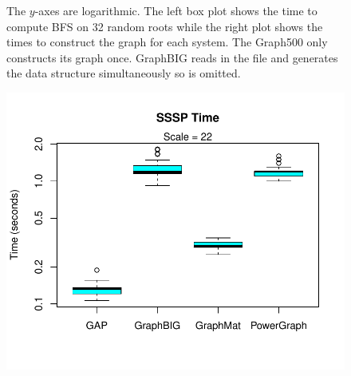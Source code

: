 \documentclass[conference]{IEEEtran}
\begin{document}
\begin{figure}
\begin{minipage}{0.48\linewidth}
	\end{minipage}
	\caption{The $y$-axes are logarithmic. The left box plot shows the time to compute BFS on 32 random roots while the right plot shows the times to construct the graph for each system. The Graph500 only constructs its graph once. GraphBIG reads in the file and generates the data structure simultaneously so is omitted.}
	\label{fig:bfs-time}
\end{figure}

\begin{figure}
	\centering
	\begin{minipage}{0.59\linewidth}
		\includegraphics[width=\linewidth, trim=0 36pt 18pt 0, clip]{graphics/sssp_time.pdf}
	\end{minipage}
	\begin{minipage}{0.365\linewidth}

\end{minipage}
\end{figure}
\end{document}
